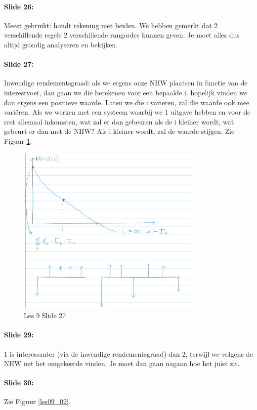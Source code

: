 \documentclass[10pt,a4paper]{report}
\begin{document}
\paragraph{Slide 26:} Meest gebruikt: houdt rekening met beiden. We hebben gemerkt dat 2 verschillende regels 2 verschillende rangordes kunnen geven. Je moet alles dus altijd grondig analyseren en bekijken.

\paragraph{Slide 27:} Inwendige rendementsgraad: als we ergens onze NHW plaatsen in functie van de interestvoet, dan gaan we die berekenen voor een bepaalde i. hopelijk vinden we dan ergens een positieve waarde. Laten we die i vari\"eren, zal die waarde ook mee vari\"eren. Als we werken met een systeem waarbij we 1 uitgave hebben en voor de rest allemaal inkomsten, wat zal er dan gebeuren als de i kleiner wordt, wat gebeurt er dan met de NHW? Als i kleiner wordt, zal de waarde stijgen. Zie Figuur \ref{les09_01}.

\begin{figure}[h!]
\centering
\includegraphics[width=90mm]{Les09_01.png}
\caption{Les 9 Slide 27} 
\label{les09_01}
\end{figure}

\paragraph{Slide 29:} 1 is interessanter (via de inwendige rendementsgraad) dan 2, terwijl we volgens de NHW net het omgekeerde vinden. Je moet dan gaan nagaan hoe het juist zit. 

\paragraph{Slide 30:} Zie Figuur \ref{les09_02}.
\end{document}
